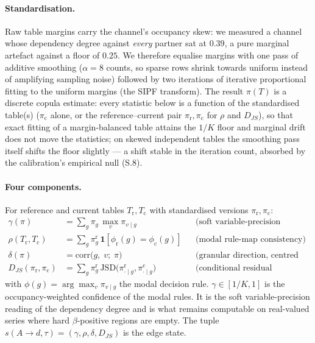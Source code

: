 \documentclass[11pt,a4paper]{article}
\begin{document}
\paragraph{Standardisation.} Raw table margins carry the channel's occupancy
skew: we measured a channel whose dependency degree against \emph{every}
partner sat at $0.39$, a pure marginal artefact against a floor of $0.25$.
We therefore equalise margins with one pass of additive smoothing
($\alpha{=}8$ counts, so sparse rows shrink towards uniform instead of
amplifying sampling noise) followed by two iterations of
iterative proportional fitting to the uniform margins (the SIPF
transform). The result $\pi(T)$ is
a discrete copula estimate: every statistic below is a function of the
standardised table(s) ($\pi_{\mathrm{c}}$ alone, or the reference--current
pair $\pi_{\mathrm{r}},\pi_{\mathrm{c}}$ for $\rho$ and $D_{JS}$), so
that exact fitting of a margin-balanced table attains the $1/K$ floor and
marginal drift does not move the statistics; on skewed independent tables
the smoothing pass itself shifts the floor slightly --- a shift stable in
the iteration count, absorbed by the calibration's empirical null (S.8).

\paragraph{Four components.} For reference and current tables
$T_{\mathrm{r}},T_{\mathrm{c}}$ with standardised versions
$\pi_{\mathrm{r}},\pi_{\mathrm{c}}$:
\begin{align}
\gamma(\pi) &= \sum_{g}\pi_g\,\max_{v}\pi_{v\mid g}
  &&\text{(soft variable-precision dependency degree)}\\
\rho(T_{\mathrm{r}},T_{\mathrm{c}}) &=
  \sum_{g}\pi^{\mathrm{r}}_g\,\mathbf{1}\!\left[\phi_{\mathrm{r}}(g)=\phi_{\mathrm{c}}(g)\right]
  &&\text{(modal rule-map consistency)}\\
\delta(\pi) &= \mathrm{corr}\big(g,\;v;\;\pi\big)
  &&\text{(granular direction, centred indices)}\\
D_{JS}(\pi_{\mathrm{r}},\pi_{\mathrm{c}}) &=
  \sum_{g}\pi^{\mathrm{r}}_g\,\mathrm{JSD}\big(\pi^{\mathrm{r}}_{\cdot\mid g},
  \pi^{\mathrm{c}}_{\cdot\mid g}\big)
  &&\text{(conditional residual divergence)}
\end{align}
with $\phi(g)=\arg\max_v\pi_{v\mid g}$ the modal decision rule.
$\gamma\in[1/K,1]$ is the occupancy-weighted confidence of the modal rules.
It is the soft variable-precision reading of the dependency degree
\citep{ziarko1993} and is what remains computable on real-valued series where
hard $\beta$-positive regions are empty. The tuple
$s(A\!\to\! d,\tau)=(\gamma,\rho,\delta,D_{JS})$ is the edge state.
\end{document}
